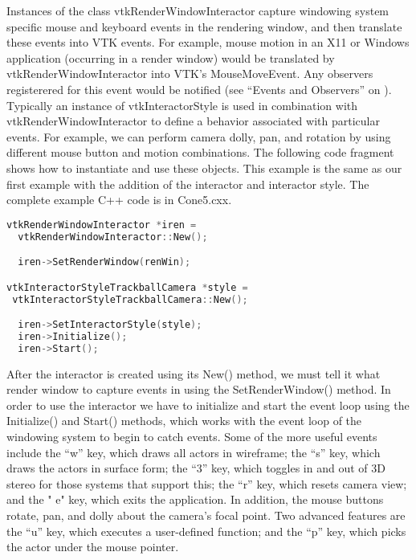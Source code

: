 Instances of the class vtkRenderWindowInteractor capture windowing system specific mouse and keyboard events in the rendering window, and then translate these events into VTK events. For example, mouse motion in an X11 or Windows application (occurring in a render window) would be translated by vtkRenderWindowInteractor into VTK's MouseMoveEvent. Any observers registerered for this event would be notified (see ``Events and Observers'' on \pageref{sub:events_observers} ). Typically an instance of vtkInteractorStyle is used in combination with vtkRenderWindowInteractor to define a behavior associated with particular events. For example, we can perform camera dolly, pan, and rotation by using different mouse button and motion combinations. The following code fragment shows how to instantiate and use these objects. This example is the same as our first example with the addition of the interactor and interactor style. The complete example C++ code is in Cone5.cxx.

\begin{lstlisting}[language=C++, caption={Cone5.cxx}]
vtkRenderWindowInteractor *iren =
  vtkRenderWindowInteractor::New();

  iren->SetRenderWindow(renWin);

vtkInteractorStyleTrackballCamera *style =
 vtkInteractorStyleTrackballCamera::New();

  iren->SetInteractorStyle(style);
  iren->Initialize();
  iren->Start();
\end{lstlisting}

After the interactor is created using its New() method, we must tell it what render window to capture events in using the SetRenderWindow() method. In order to use the interactor we have to initialize and start the event loop using the Initialize() and Start() methods, which works with the event loop of the windowing system to begin to catch events. Some of the more useful events include the ``w'' key, which draws all actors in wireframe; the ``s'' key, which draws the actors in surface form; the ``3'' key, which toggles in and out of 3D stereo for those systems that support this; the ``r'' key, which resets camera view; and the " e" key, which exits the application. In addition, the mouse buttons rotate, pan, and dolly about the camera's focal point. Two advanced features are the ``u'' key, which executes a user-defined function; and the ``p'' key, which picks the actor under the mouse pointer.

